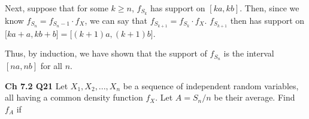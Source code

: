 \documentclass[12pt]{article}
\begin{document}
\vspace*{.5cm}
\noindent
Next, suppose that for some $k \geq n$, $f_{S_k}$ has support on $[ka, kb]$. Then, since we know $f_{S_n} = f_{S_n-1} \cdot f_X$, we can say that $f_{S_{k+1}} = f_{S_k} \cdot f_X$. $f_{S_{k+1}}$ then has support on $\big [ ka  + a, kb + b \big ] = \big [(k+1) a, (k+1) b \big ]$. 

\vspace*{.5cm}
\noindent
Thus, by induction, we have shown that the support of $f_{S_n}$ is the interval $[na, nb]$ for all $n$.

\vspace*{.5cm}
\noindent
\textbf{Ch 7.2 Q21} Let $X_1, X_2, . . . , X_n$ be a sequence of independent random variables, all having a common density function $f_X$. Let $A = S_n/n$ be their average. Find $f_A$ if
\end{document}
